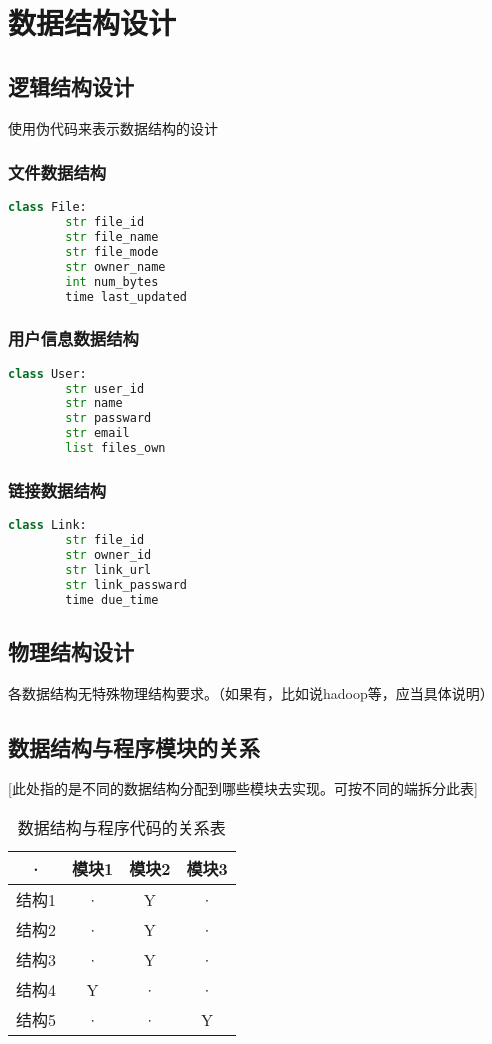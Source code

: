 \chapter{数据结构设计}

\section{逻辑结构设计}
使用伪代码来表示数据结构的设计
\subsection{文件数据结构}
\begin{lstlisting}[language=Python]
    class File:
        str file_id
        str file_name
        str file_mode
        str owner_name
        int num_bytes
        time last_updated
\end{lstlisting}

\subsection{用户信息数据结构}
\begin{lstlisting}[language=Python]
    class User:
        str user_id
        str name
        str passward
        str email
        list files_own

\end{lstlisting}
\subsection{链接数据结构}
\begin{lstlisting}[language=Python]
    class Link:
        str file_id
        str owner_id
        str link_url
        str link_passward
        time due_time

\end{lstlisting}

\section{物理结构设计}
各数据结构无特殊物理结构要求。（如果有，比如说hadoop等，应当具体说明）

\section{数据结构与程序模块的关系}
[此处指的是不同的数据结构分配到哪些模块去实现。可按不同的端拆分此表]
\begin{table}[htbp]
\centering
\caption{数据结构与程序代码的关系表} \label{tab:datastructure-module}
\begin{tabular}{|c|c|c|c|}
    \hline
    · & 模块1 & 模块2 & 模块3 \\
    \hline
    结构1 & · & Y & · \\
    \hline
    结构2 & · & Y & · \\
    \hline
    结构3 & · & Y & · \\
    \hline
    结构4 & Y & · & · \\
    \hline
    结构5 & · & · & Y \\
    \hline
\end{tabular}
\end{table}